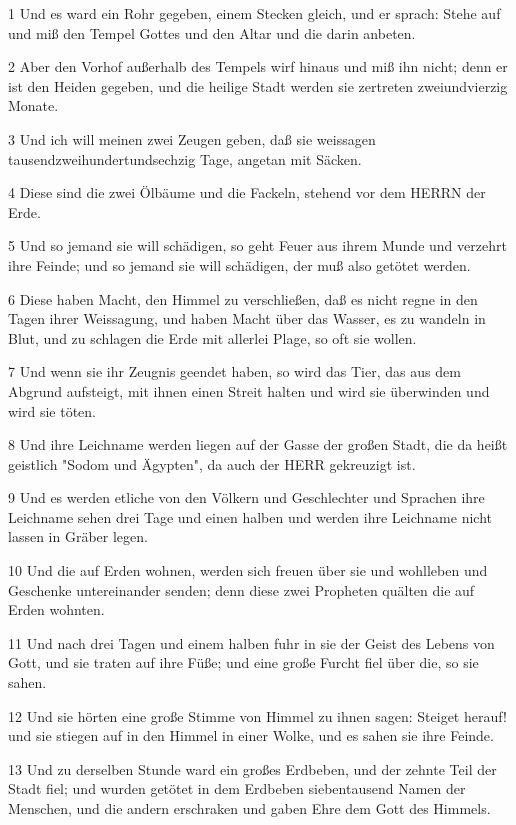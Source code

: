 \par 1 Und es ward ein Rohr gegeben, einem Stecken gleich, und er sprach: Stehe auf und miß den Tempel Gottes und den Altar und die darin anbeten.
\par 2 Aber den Vorhof außerhalb des Tempels wirf hinaus und miß ihn nicht; denn er ist den Heiden gegeben, und die heilige Stadt werden sie zertreten zweiundvierzig Monate.
\par 3 Und ich will meinen zwei Zeugen geben, daß sie weissagen tausendzweihundertundsechzig Tage, angetan mit Säcken.
\par 4 Diese sind die zwei Ölbäume und die Fackeln, stehend vor dem HERRN der Erde.
\par 5 Und so jemand sie will schädigen, so geht Feuer aus ihrem Munde und verzehrt ihre Feinde; und so jemand sie will schädigen, der muß also getötet werden.
\par 6 Diese haben Macht, den Himmel zu verschließen, daß es nicht regne in den Tagen ihrer Weissagung, und haben Macht über das Wasser, es zu wandeln in Blut, und zu schlagen die Erde mit allerlei Plage, so oft sie wollen.
\par 7 Und wenn sie ihr Zeugnis geendet haben, so wird das Tier, das aus dem Abgrund aufsteigt, mit ihnen einen Streit halten und wird sie überwinden und wird sie töten.
\par 8 Und ihre Leichname werden liegen auf der Gasse der großen Stadt, die da heißt geistlich "Sodom und Ägypten", da auch der HERR gekreuzigt ist.
\par 9 Und es werden etliche von den Völkern und Geschlechter und Sprachen ihre Leichname sehen drei Tage und einen halben und werden ihre Leichname nicht lassen in Gräber legen.
\par 10 Und die auf Erden wohnen, werden sich freuen über sie und wohlleben und Geschenke untereinander senden; denn diese zwei Propheten quälten die auf Erden wohnten.
\par 11 Und nach drei Tagen und einem halben fuhr in sie der Geist des Lebens von Gott, und sie traten auf ihre Füße; und eine große Furcht fiel über die, so sie sahen.
\par 12 Und sie hörten eine große Stimme von Himmel zu ihnen sagen: Steiget herauf! und sie stiegen auf in den Himmel in einer Wolke, und es sahen sie ihre Feinde.
\par 13 Und zu derselben Stunde ward ein großes Erdbeben, und der zehnte Teil der Stadt fiel; und wurden getötet in dem Erdbeben siebentausend Namen der Menschen, und die andern erschraken und gaben Ehre dem Gott des Himmels.
